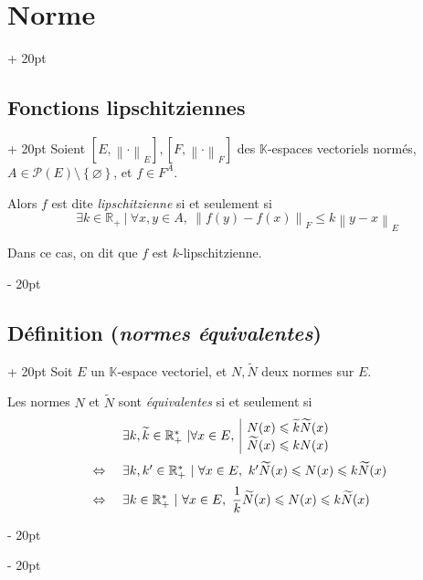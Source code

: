 \documentclass[a4paper, 12pt, twoside]{article}
\newcommand{\R}{\mathbb{R}} %
\newcommand{\K}{\mathbb K}
\newcommand{\lrb}[1]{\left[ #1 \right]}
\newcommand{\set}[1]{\left\{ #1 \right\}}
\newcommand{\norm}[1]{\left\lVert #1 \right\rVert}
\newcommand{\ssi}{\ \Leftrightarrow \ }
\renewcommand{\le}{\leqslant}
\newcommand{\ind}[1][20pt]{\advance\leftskip + #1}
\newcommand{\deind}[1][20pt]{\advance\leftskip - #1}
\newenvironment{indt}[2][20pt]{#2 \par \ind[#1]}{\par \deind} %
\begin{document}
\begin{indt}{\section{Norme}}
        \vspace{12pt}
        
        \begin{indt}{\subsection{Fonctions lipschitziennes}}
            Soient $\lrb{E, \norm \cdot _E}, \lrb{F, \norm \cdot _F}$ des $\K$-espaces vectoriels normés, $A \in \mathcal P(E) \setminus \set \varnothing$, et $f \in F^A$.

            Alors $f$ est dite \emph{lipschitzienne} si et seulement si
            \[
                \exists k \in \R_+\ |\ \forall x, y \in A,\
                \norm{f(y) - f(x)}_F \le k\norm{y - x}_E
            \]

            Dans ce cas, on dit que $f$ est $k$-lipschitzienne.
        \end{indt}

        \vspace{12pt}
        
        \begin{indt}{\subsection{Définition (\textit{normes équivalentes})}}
            Soit $E$ un $\K$-espace vectoriel, et $N, \widetilde N$ deux normes sur $E$.

            Les normes $N$ et $\widetilde N$ sont \emph{équivalentes} si et seulement si
            \[
                \begin{array}{cl}
                    &
                    \exists k, \widetilde k \in \R^*_+\ |
                    \forall x \in E,\
                    \begin{array}{|l}
                        N(x) \le \widetilde k \widetilde N(x)
                        \\
                        \widetilde N(x) \le k N(x)
                    \end{array}
                    \vspace{6pt}
                    \\
                    \ssi&
                    \exists k, k' \in \R^*_+\ |\
                    \forall x \in E,\
                    k' \widetilde N(x) \le N(x) \le k \widetilde N(x)
                    \vspace{6pt}
                    \\
                    \ssi&
                    \exists k \in \R^*_+\ |\
                    \forall x \in E,\
                    \dfrac{1}{k} \widetilde N(x) \le N(x) \le k \widetilde N(x)
                \end{array}
            \]
        \end{indt}
    \end{indt}
\end{document}
